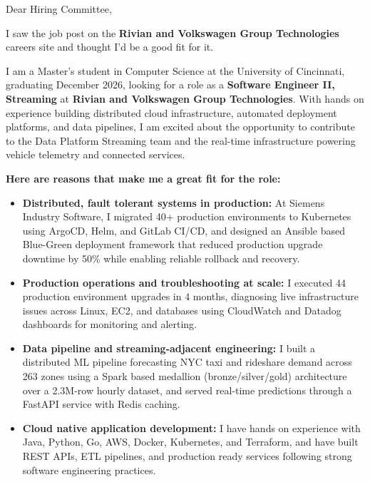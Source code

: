 \documentclass[11pt]{letter}
\date{}
\begin{document}
\begin{letter}{}

\opening{Dear Hiring Committee,}

I saw the job post on the \textbf{Rivian and Volkswagen Group Technologies} careers site and thought I'd be a good fit for it.

I am a Master's student in Computer Science at the University of Cincinnati, graduating December 2026, looking for a role as a \textbf{Software Engineer II, Streaming} at \textbf{Rivian and Volkswagen Group Technologies}. With hands on experience building distributed cloud infrastructure, automated deployment platforms, and data pipelines, I am excited about the opportunity to contribute to the Data Platform Streaming team and the real-time infrastructure powering vehicle telemetry and connected services.

\textbf{Here are reasons that make me a great fit for the role:}

\begin{itemize}[leftmargin=*, itemsep=0.45em]
    \item \textbf{Distributed, fault tolerant systems in production:} At Siemens Industry Software, I migrated 40+ production environments to Kubernetes using ArgoCD, Helm, and GitLab CI/CD, and designed an Ansible based Blue-Green deployment framework that reduced production upgrade downtime by 50\% while enabling reliable rollback and recovery.

    \item \textbf{Production operations and troubleshooting at scale:} I executed 44 production environment upgrades in 4 months, diagnosing live infrastructure issues across Linux, EC2, and databases using CloudWatch and Datadog dashboards for monitoring and alerting.

    \item \textbf{Data pipeline and streaming-adjacent engineering:} I built a distributed ML pipeline forecasting NYC taxi and rideshare demand across 263 zones using a Spark based medallion (bronze/silver/gold) architecture over a 2.3M-row hourly dataset, and served real-time predictions through a FastAPI service with Redis caching.

    \item \textbf{Cloud native application development:} I have hands on experience with Java, Python, Go, AWS, Docker, Kubernetes, and Terraform, and have built REST APIs, ETL pipelines, and production ready services following strong software engineering practices.


\end{itemize}
\end{letter}
\end{document}
